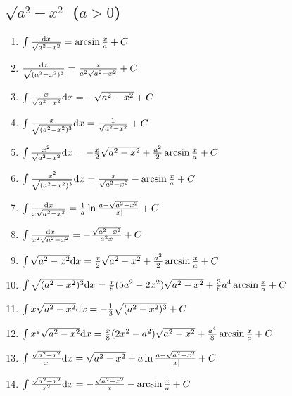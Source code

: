 	\subsection{$\sqrt{a^2-x^2}$ ($a>0$)}

	\begin{enumerate}

	\item $ \int \frac{\mathrm{d} x}{\sqrt{a^2-x^2}} = \arcsin \frac{x}{a} + C $

	\item $ \frac{\mathrm{d} x}{\sqrt{(a^2-x^2)^3}} = \frac{x}{a^2\sqrt{a^2-x^2}} + C $

	\item $ \int \frac{x}{\sqrt{a^2-x^2}} \mathrm{d} x = -\sqrt{a^2-x^2} + C $

	\item $ \int \frac{x}{\sqrt{(a^2-x^2)^3}} \mathrm{d} x = \frac{1}{\sqrt{a^2-x^2}} + C $

	\item $ \int \frac{x^2}{\sqrt{a^2-x^2}} \mathrm{d} x = -\frac{x}{2}\sqrt{a^2-x^2} + \frac{a^2}{2}\arcsin\frac{x}{a} + C $

	\item $ \int \frac{x^2}{\sqrt{(a^2-x^2)^3}} \mathrm{d} x = \frac{x}{\sqrt{a^2-x^2}} - \arcsin\frac{x}{a} + C $

	\item $ \int \frac{\mathrm{d} x}{x\sqrt{a^2-x^2}} = \frac{1}{a}\ln\frac{a-\sqrt{a^2-x^2}}{|x|} + C$

	\item $ \int \frac{\mathrm{d} x}{x^2\sqrt{a^2-x^2}} = -\frac{\sqrt{a^2-x^2}}{a^2x} + C $

	\item $ \int \sqrt{a^2-x^2}\mathrm{d} x = \frac{x}{2}\sqrt{a^2-x^2} + \frac{a^2}{2}\arcsin\frac{x}{a} + C $

	\item $ \int \sqrt{(a^2-x^2)^3}\mathrm{d} x = \frac{x}{8}(5a^2-2x^2)\sqrt{a^2-x^2}+\frac{3}{8}a^4\arcsin\frac{x}{a} + C $

	\item $ \int x\sqrt{a^2-x^2}\mathrm{d} x = -\frac{1}{3}\sqrt{(a^2-x^2)^3} + C $

	\item $ \int x^2\sqrt{a^2-x^2}\mathrm{d} x = \frac{x}{8}(2x^2-a^2)\sqrt{a^2-x^2}+\frac{a^4}{8}\arcsin\frac{x}{a} + C $

	\item $ \int \frac{\sqrt{a^2-x^2}}{x}\mathrm{d} x = \sqrt{a^2-x^2} + a \ln \frac{a-\sqrt{a^2-x^2}}{|x|} + C $

	\item $ \int \frac{\sqrt{a^2-x^2}}{x^2} \mathrm{d} x = -\frac{\sqrt{a^2-x^2}}{x} - \arcsin\frac{x}{a} + C $

	\end{enumerate}

